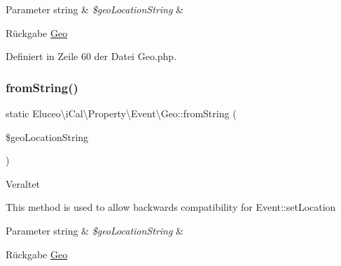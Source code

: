 \begin{DoxyParams}[1]{Parameter}
string & {\em \$geo\+Location\+String} & \\
\hline
\end{DoxyParams}
\begin{DoxyReturn}{Rückgabe}
\mbox{\hyperlink{class_eluceo_1_1i_cal_1_1_property_1_1_event_1_1_geo}{Geo}} 
\end{DoxyReturn}


Definiert in Zeile 60 der Datei Geo.\+php.

\mbox{\label{class_eluceo_1_1i_cal_1_1_property_1_1_event_1_1_geo_a8610d5433703bb05b2f1e48a44b93a81}} 
\subsubsection{\texorpdfstring{from\+String()}{fromString()}\hspace{0.1cm}{\footnotesize\ttfamily [3/3]}}
{\footnotesize\ttfamily static Eluceo\textbackslash{}i\+Cal\textbackslash{}\+Property\textbackslash{}\+Event\textbackslash{}\+Geo\+::from\+String (\begin{DoxyParamCaption}\item[{string}]{\$geo\+Location\+String }\end{DoxyParamCaption})\hspace{0.3cm}{\ttfamily [static]}}

\begin{DoxyRefDesc}{Veraltet}
\item[\mbox{\hyperlink{deprecated__deprecated000033}{Veraltet}}]This method is used to allow backwards compatibility for Event\+::set\+Location\end{DoxyRefDesc}



\begin{DoxyParams}[1]{Parameter}
string & {\em \$geo\+Location\+String} & \\
\hline
\end{DoxyParams}
\begin{DoxyReturn}{Rückgabe}
\mbox{\hyperlink{class_eluceo_1_1i_cal_1_1_property_1_1_event_1_1_geo}{Geo}} 
\end{DoxyReturn}


